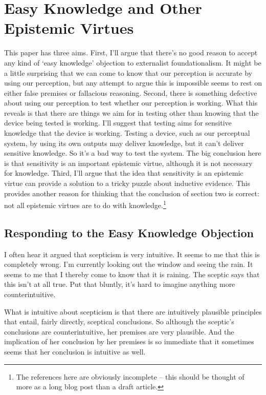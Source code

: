\chapter{Easy Knowledge and Other Epistemic Virtues}

\inprog{}

\noindent This paper has three aims. First, I'll argue that there's no good reason to accept any kind of `easy knowledge' objection to externalist foundationalism. It might be a little surprising that we can come to know that our perception is accurate by using our perception, but any attempt to argue this is impossible seems to rest on either false premises or fallacious reasoning. Second, there is something defective about using our perception to test whether our perception is working. What this reveals is that there are things we aim for in testing other than knowing that the device being tested is working. I'll suggest that testing aims for sensitive knowledge that the device is working. Testing a device, such as our perceptual system, by using its own outputs may deliver knowledge, but it can't deliver sensitive knowledge. So it's a bad way to test the system. The big conclusion here is that sensitivity is an important epistemic virtue, although it is not necessary for knowledge. Third, I'll argue that the idea that sensitivity is an epistemic virtue can provide a solution to a tricky puzzle about inductive evidence. This provides another reason for thinking that the conclusion of section two is correct: not all epistemic virtues are to do with knowledge.\footnote{The references here are obviously incomplete -- this should be thought of more as a long blog post than a draft article.}

\section{Responding to the Easy Knowledge Objection}

I often hear it argued that scepticism is very intuitive. It seems to me that this is completely wrong. I'm currently looking out the window and seeing the rain. It seems to me that I thereby come to know that it is raining. The sceptic says that this isn't at all true. Put that bluntly, it's hard to imagine anything more counterintuitive.

What is intuitive about scepticism is that there are intuitively plausible principles that entail, fairly directly, sceptical conclusions. So although the sceptic's conclusions are counterintuitive, her premises are very plausible. And the implication of her conclusion by her premises is so immediate that it sometimes seems that her conclusion is intuitive as well.

